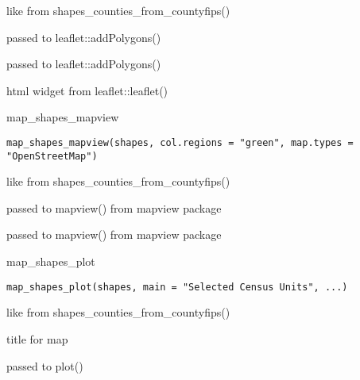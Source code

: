 \documentclass[a4paper]{book}
\begin{document}
%
\begin{Arguments}
\begin{ldescription}
\item[\code{shapes}] like from shapes\_counties\_from\_countyfips()

\item[\code{color}] passed to leaflet::addPolygons()

\item[\code{popup}] passed to leaflet::addPolygons()
\end{ldescription}
\end{Arguments}
%
\begin{Value}
html widget from leaflet::leaflet()
\end{Value}
%
\begin{Description}\relax
map\_shapes\_mapview
\end{Description}
%
\begin{Usage}
\begin{verbatim}
map_shapes_mapview(shapes, col.regions = "green", map.types = "OpenStreetMap")
\end{verbatim}
\end{Usage}
%
\begin{Arguments}
\begin{ldescription}
\item[\code{shapes}] like from shapes\_counties\_from\_countyfips()

\item[\code{col.regions}] passed to mapview() from mapview package

\item[\code{map.types}] passed to mapview() from mapview package
\end{ldescription}
\end{Arguments}
%
\begin{Description}\relax
map\_shapes\_plot
\end{Description}
%
\begin{Usage}
\begin{verbatim}
map_shapes_plot(shapes, main = "Selected Census Units", ...)
\end{verbatim}
\end{Usage}
%
\begin{Arguments}
\begin{ldescription}
\item[\code{shapes}] like from shapes\_counties\_from\_countyfips()

\item[\code{main}] title for map

\item[\code{...}] passed to plot()
\end{ldescription}
\end{Arguments}
\end{document}
